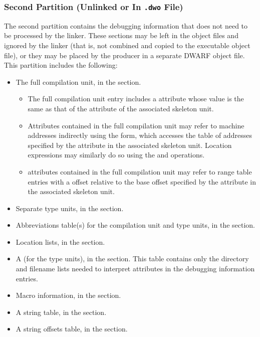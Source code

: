 \subsubsection{Second Partition (Unlinked or In \texttt{.dwo} File)}
The second partition contains the debugging information that
does not need to be processed by the linker. These sections
may be left in the object files and ignored by the linker
(that is, not combined and copied to the executable object file), or
they may be placed by the producer in a separate DWARF object
file. This partition includes the following:
\begin{itemize}
\item
The full compilation unit, in the \dotdebuginfodwo{} section.
\begin{itemize}
\item
The full compilation unit entry includes a \DWATdwoid{} 
attribute whose value is the same as that of the \DWATdwoid{} 
attribute of the associated skeleton unit.
\item
Attributes contained in the full compilation unit
may refer to machine addresses indirectly using the \DWFORMaddrx{} 
form, which accesses the table of addresses specified by the
\DWATaddrbase{} attribute in the associated skeleton unit.
Location expressions may similarly do so using the \DWOPaddrx{} and
\DWOPconstx{} operations. 
\item
\DWATranges{} attributes contained in the full compilation unit
may refer to range table entries with a \DWFORMsecoffset{} offset 
relative to the base offset specified by the \DWATrangesbase{}
attribute in the associated skeleton unit.
\end{itemize}
\item Separate type units, in the \dotdebuginfodwo{} section.

\item
Abbreviations table(s) for the compilation unit and type
units, in the \dotdebugabbrevdwo{} section.

\item Location lists, in the \dotdebuglocdwo{} section.

\item
A  (for the type units), 
in the \dotdebuglinedwo{} section. This table
contains only the directory and filename lists needed to
interpret \DWATdeclfile{} attributes in the debugging
information entries.

\item Macro information, in the \dotdebugmacrodwo{} section.

\item A string table, in the \dotdebugstrdwo{} section.

\item A string offsets table, in the \dotdebugstroffsetsdwo{}
section.
\end{itemize}

